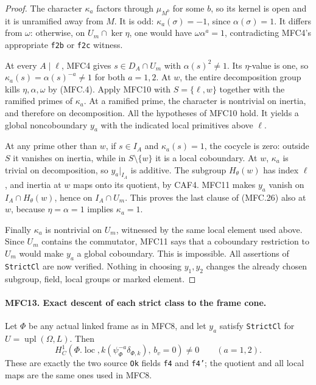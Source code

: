 \begin{proof}
The character \(\kappa_a\) factors through \(\mu_{M^b}\)
for some \(b\), so its kernel is open and it is unramified
away from \(M\).  It is odd:
\(\kappa_a(\sigma)=-1\), since \(\alpha(\sigma)=1\).
It differs from \(\omega\): otherwise, on
\(U_m\cap\ker\eta\), one would have
\(\omega\alpha^a=1\), contradicting MFC4's appropriate
\texttt{f2b} or \texttt{f2c} witness.

At every \(A\mid\ell\), MFC4 gives \(s\in D_A\cap U_m\)
with \(\alpha(s)^2\ne1\).  Its \(\eta\)-value is one,
so \(\kappa_a(s)=\alpha(s)^{-a}\ne1\) for both \(a=1,2\).
At \(w\), the entire decomposition group kills
\(\eta,\alpha,\omega\) by (MFC.4).  Apply MFC10 with
\(S=\{\ell,w\}\) together with the ramified primes of
\(\kappa_a\).  At a ramified prime, the character is
nontrivial on inertia, and therefore on decomposition.  All
the hypotheses of MFC10 hold.  It yields a global noncoboundary
\(y_a\) with the indicated local primitives above \(\ell\).

At any prime other than \(w\), if
\(s\in I_A\) and \(\kappa_a(s)=1\), the cocycle is zero:
outside \(S\) it vanishes on inertia, while in
\(S\setminus\{w\}\) it is a local coboundary.
At \(w\), \(\kappa_a\) is trivial on decomposition, so
\(y_a|_{I_A}\) is additive.  The subgroup \(H_\theta(w)\)
has index \(\ell\), and inertia at \(w\) maps onto its
quotient, by CAF4.  MFC11 makes \(y_a\) vanish on
\(I_A\cap H_\theta(w)\), hence on \(I_A\cap U_m\).
This proves the last clause of (MFC.26) also at \(w\),
because \(\eta=\alpha=1\) implies \(\kappa_a=1\).

Finally \(\kappa_a\) is nontrivial on \(U_m\), witnessed
by the same local element used above.  Since \(U_m\) contains
the commutator, MFC11 says that a coboundary restriction to
\(U_m\) would make \(y_a\) a global coboundary.  This is
impossible.  All assertions of \texttt{StrictCl} are now verified.
Nothing in choosing \(y_1,y_2\) changes the already chosen
subgroup, field, local groups or marked element.
\end{proof}

\paragraph{MFC13. Exact descent of each strict class to the frame cone.}
\label{claim:MFC13}
Let \(\Phi\) be any actual linked frame as in MFC8, and let
\(y_a\) satisfy \texttt{StrictCl} for \(U=\operatorname{upl}(\Omega,L)\).
Then
\[
 H^1_C\!\left(\Phi.\operatorname{loc},
    k(\psi_\Phi^{-a}\delta_{\Phi,k}),\,b_v=0\right)
                         \ne0\qquad(a=1,2).               \tag{MFC.27}
\]
These are exactly the two source \texttt{Ok} fields
\texttt{f4} and \texttt{f4'}; the quotient and all local
maps are the same ones used in MFC8.

